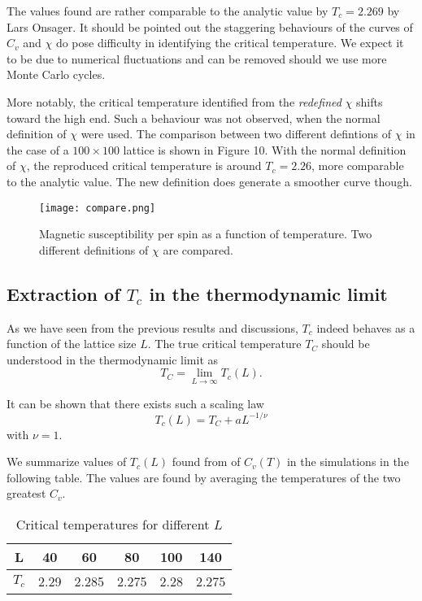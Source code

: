 \documentclass{article}
\begin{document}
The values found are rather comparable to the analytic value by $T_c = 2.269$ by Lars Onsager.\cite{notes} It should be pointed out the staggering behaviours of the curves of $C_v$ and $\chi$ do pose difficulty in identifying the critical temperature. We expect it to be due to numerical fluctuations and can be removed should we use more Monte Carlo cycles. 

More notably, the critical temperature identified from the \emph{redefined} $\chi$ shifts toward the high end. Such a behaviour was not observed, when the normal definition of $\chi$ were used. The comparison between two different defintions of $\chi$ in the case of a $100\times100$ lattice is shown in Figure 10. With the normal definition of $\chi$, the reproduced critical temperature is around $T_c =2.26$, more comparable to the analytic value. The new definition does generate a smoother curve though.

\begin{figure}[H]
\begin{center}
\texttt{[image: compare.png]}
\caption{Magnetic susceptibility per spin as a function of temperature. Two different definitions of $\chi$ are compared.}
\end{center}
\end{figure}

\subsection{Extraction of $T_c$ in the thermodynamic limit}
As we have seen from the previous results and discussions, $T_c$ indeed behaves as a function of the lattice size $L$. The true critical temperature $T_C$ should be understood in the thermodynamic limit as \cite{notes}
\begin{equation}
T_C = \lim_{L \to \infty} T_c(L). 
\end{equation}

It can be shown that there exists such a scaling law
\begin{equation}
T_c(L) = T_C + aL^{-1/\nu}
\end{equation}
with $\nu = 1$.\cite{notes}

We summarize values of $T_c(L)$ found from of $C_v(T)$ in the simulations in the following table. The values are found by averaging the temperatures of the two greatest $C_v$.

\begin{table}[ht]
\caption{Critical temperatures for different $L$}
\centering
\begin{tabular}{c c c c c c}
\hline\hline
 L & 40 & 60 & 80 & 100 & 140\\
 \hline
 $T_c$ & 2.29 &2.285 & 2.275 & 2.28 & 2.275 \\
 \hline
\end{tabular}
\end{table}
\end{document}
